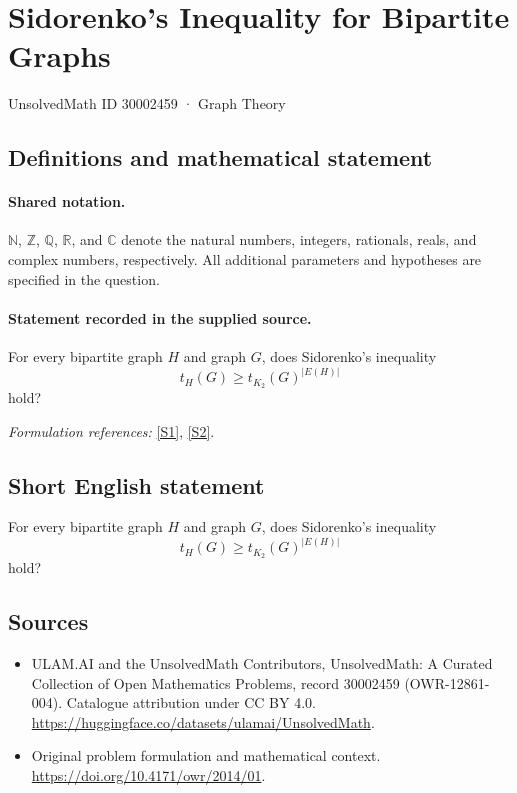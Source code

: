 \documentclass[11pt]{article}
\newcommand{\sref}[2]{\hyperlink{source:#1:#2}{[S#2]}}
\begin{document}
\setcounter{section}{30002458}
\section{Sidorenko's Inequality for Bipartite Graphs}\label{30002459}
{\small UnsolvedMath ID 30002459 · Graph Theory}
\subsection{Definitions and mathematical statement}

\paragraph{Shared notation.}$\mathbb N$, $\mathbb Z$, $\mathbb Q$, $\mathbb R$, and $\mathbb C$ denote the natural numbers, integers, rationals, reals, and complex numbers, respectively. All additional parameters and hypotheses are specified in the question.


\paragraph{Statement recorded in the supplied source.}
For every bipartite graph $H$ and graph $G$, does Sidorenko's inequality
$$t_H(G)\geq t_{K_2}(G)^{|E(H)|}$$
hold?
\par\smallskip\textit{Formulation references:} \sref{30002459}{1}, \sref{30002459}{2}.
\subsection{Short English statement}
For every bipartite graph $H$ and graph $G$, does Sidorenko's inequality
$$t_H(G)\geq t_{K_2}(G)^{|E(H)|}$$
hold?
\subsection{Sources}
\begin{itemize}
\item[\hypertarget{source:30002459:1}{S1}] ULAM.AI and the UnsolvedMath Contributors, UnsolvedMath: A Curated Collection of Open Mathematics Problems, record 30002459 (OWR-12861-004). Catalogue attribution under CC BY 4.0.
\url{https://huggingface.co/datasets/ulamai/UnsolvedMath}.
\item[\hypertarget{source:30002459:2}{S2}] Original problem formulation and mathematical context.
\url{https://doi.org/10.4171/owr/2014/01}.
\end{itemize}
\label{end:30002459}
\end{document}
